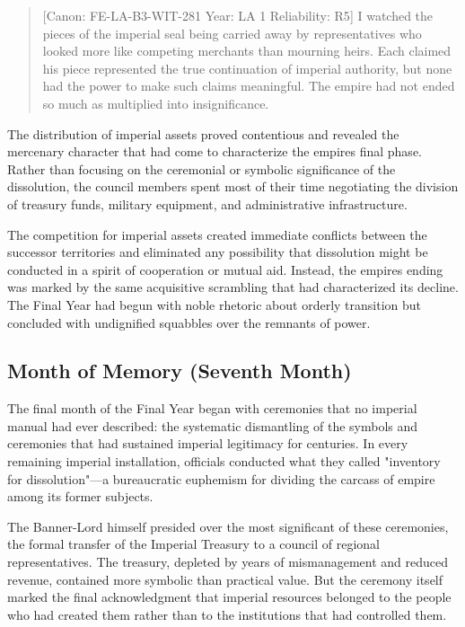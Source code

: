 \begin{quote}
{[}Canon: FE-LA-B3-WIT-281 \textbar{} Year: LA 1 \textbar{} Reliability:
R5{]} I watched the pieces of the imperial seal being carried away by
representatives who looked more like competing merchants than mourning
heirs. Each claimed his piece represented the true continuation of
imperial authority, but none had the power to make such claims
meaningful. The empire had not ended so much as multiplied into
insignificance.
\end{quote}

The distribution of imperial assets proved contentious and revealed the
mercenary character that had come to characterize the
empire\textquotesingle s final phase. Rather than focusing on the
ceremonial or symbolic significance of the dissolution, the council
members spent most of their time negotiating the division of treasury
funds, military equipment, and administrative infrastructure.

The competition for imperial assets created immediate conflicts between
the successor territories and eliminated any possibility that
dissolution might be conducted in a spirit of cooperation or mutual aid.
Instead, the empire\textquotesingle s ending was marked by the same
acquisitive scrambling that had characterized its decline. The Final
Year had begun with noble rhetoric about orderly transition but
concluded with undignified squabbles over the remnants of power.

\subsection{Month of Memory (Seventh
Month)}\label{month-of-memory-seventh-month}

The final month of the Final Year began with ceremonies that no imperial
manual had ever described: the systematic dismantling of the symbols and
ceremonies that had sustained imperial legitimacy for centuries. In
every remaining imperial installation, officials conducted what they
called "inventory for dissolution"---a bureaucratic euphemism for
dividing the carcass of empire among its former subjects.

The Banner-Lord himself presided over the most significant of these
ceremonies, the formal transfer of the Imperial Treasury to a council of
regional representatives. The treasury, depleted by years of
mismanagement and reduced revenue, contained more symbolic than
practical value. But the ceremony itself marked the final acknowledgment
that imperial resources belonged to the people who had created them
rather than to the institutions that had controlled them.

